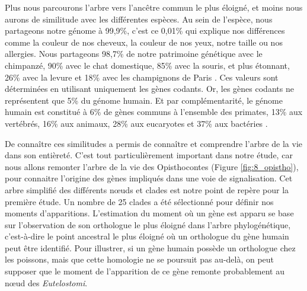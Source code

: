 \par Plus nous parcourons l’arbre vers l’ancêtre commun le plus éloigné, et moins nous aurons de similitude avec les différentes espèces. Au sein de l’espèce, nous partageons notre génome à 99,9\%, c’est ce 0,01\% qui explique nos différences comme la couleur de nos cheveux, la couleur de nos yeux, notre taille ou nos allergies. Nous partageons 98,7\% de notre patrimoine génétique avec le chimpanzé, 90\% avec le chat domestique, 85\% avec la souris, et plus étonnant, 26\% avec la levure et 18\% avec les champignons de Paris \parencite{roy_biotechnology_2010}. Ces valeurs sont déterminées en utilisant uniquement les gènes codants. Or, les gènes codants ne représentent que 5\% du génome humain. Et par complémentarité, le génome humain est constitué à 6\% de gènes communs à l’ensemble des primates, 13\% aux vertébrés, 16\% aux animaux, 28\% aux eucaryotes et 37\% aux bactéries \parencite{domazet-loso_ancient_2008, mcfall-ngai_animals_2013}.
\par De connaître ces similitudes a permis de connaître et comprendre l’arbre de la vie dans son entièreté. C’est tout particulièrement important dans notre étude, car nous allons remonter l’arbre de la vie des Opisthocontes (Figure \ref{fig:8_opistho}), pour connaitre l’origine des gènes impliqués dans une voie de signalisation. Cet arbre simplifié des différents nœuds et clades est notre point de repère pour la première étude. Un nombre de 25 clades a été sélectionné pour définir nos moments d’apparitions. L'estimation du moment où un gène est apparu se base sur l'observation de son orthologue le plus éloigné dans l'arbre phylogénétique, c'est-à-dire le point ancestral le plus éloigné où un orthologue du gène humain peut être identifié. Pour illustrer, si un gène humain possède un orthologue chez les poissons, mais que cette homologie ne se poursuit pas au-delà, on peut supposer que le moment de l'apparition de ce gène remonte probablement au nœud des \textit{Eutelostomi}.

